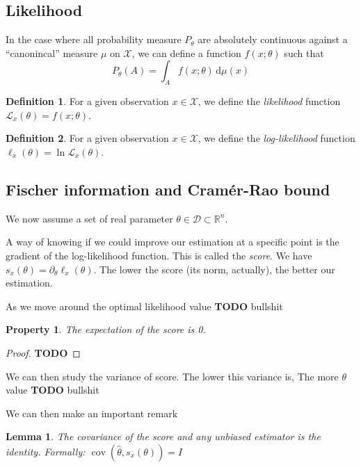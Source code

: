 \documentclass[10pt]{report}
\theoremstyle{plain}
\newtheorem{prop}[thm]{Property}
\newtheorem{lem}[thm]{Lemma}
\theoremstyle{definition}
\newtheorem{defn}{Definition}[chapter]
\theoremstyle{remark}
\newcommand{\R}{\ensuremath{\mathbb{R}}}
\newcommand{\TODO}{\textbf{TODO}}
\newcommand{\dd}{\mathrm{d}}
\DeclareMathOperator{\cov}{cov}
\begin{document}
\subsection{Likelihood}

In the case where all probability measure $P_\theta$ are absolutely
continuous against a ``canonincal'' measure $\mu$ on $\mathcal{X}$, we can
define a function $f(x;\theta)$ such that
\[P_\theta(A) = \int_A f(x;\theta)\,\dd \mu(x)\]

\begin{defn}
  For a given observation $x \in \mathcal{X}$, we define the \emph{likelihood} function
  $\mathcal{L}_x(\theta) = f(x;\theta)$.
\end{defn}

\begin{defn}
  For a given observation $x \in \mathcal{X}$, we define the \emph{log-likelihood} function
  $\ell_x(\theta) = \ln \mathcal{L}_x(\theta)$.
\end{defn}

\subsection{Fischer information and Cramér-Rao bound}

We now assume a set of real parameter $\theta \in \mathcal{D} \subset \R^n$.

A way of knowing if we could improve our estimation at a specific point is the
gradient of the log-likelihood function. This is called the
\emph{score}. We have $s_x(\theta) = \partial_\theta \ell_x(\theta)$. The
lower the score (its norm, actually), the better our estimation.

As we move around the optimal likelihood value \TODO{} bullshit

\begin{prop} The expectation of the score is 0.
\end{prop}
\begin{proof}
  \TODO{}
\end{proof}

We can then study the variance of score. The lower this variance is, The more
$\theta$ value \TODO{} bullshit

We can then make an important remark

\begin{lem}\label{lem:corscr}
  The covariance of the score and any unbiased estimator is the identity.
  Formally: $\cov(\hat \theta, s_x(\theta)) = I$
\end{lem}
\end{document}
